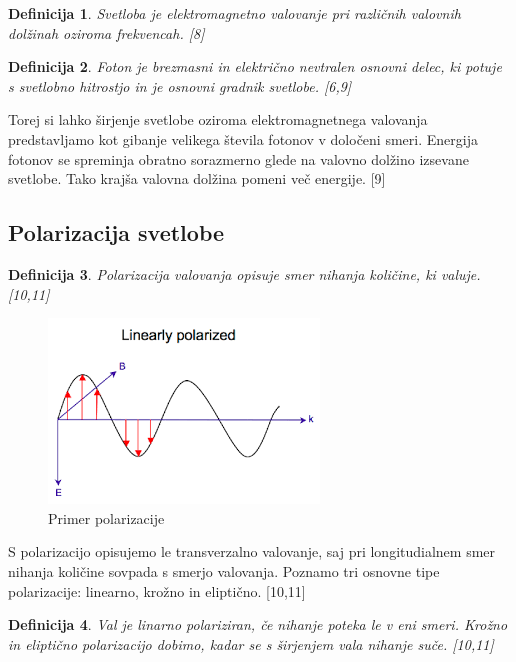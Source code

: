 \documentclass[A4paper, 11pt]{article}
\newtheorem{definicija}{Definicija}
\begin{document}
\begin{definicija}
Svetloba je elektromagnetno valovanje pri različnih valovnih dolžinah oziroma frekvencah. [8]
\end{definicija}

\begin{definicija}
Foton je brezmasni in električno nevtralen osnovni delec, ki potuje s svetlobno hitrostjo in je osnovni gradnik svetlobe. [6,9]
\end{definicija} 

Torej si lahko širjenje svetlobe oziroma elektromagnetnega valovanja predstavljamo kot gibanje velikega števila fotonov v določeni smeri. Energija fotonov se spreminja obratno sorazmerno glede na valovno dolžino izsevane svetlobe. Tako krajša valovna dolžina pomeni več energije. [9]

\subsection{Polarizacija svetlobe}

\begin{definicija}
Polarizacija valovanja opisuje smer nihanja količine, ki valuje. [10,11]
\end{definicija}

\begin{figure}[h]
\centering
\caption{Primer polarizacije}
\includegraphics[scale=0.75]{images}
\end{figure}

S polarizacijo opisujemo le transverzalno valovanje, saj pri longitudialnem smer nihanja količine sovpada s smerjo valovanja. Poznamo tri osnovne tipe polarizacije: linearno, krožno in eliptično. [10,11]

\begin{definicija}
Val je linarno polariziran, če nihanje poteka le v eni smeri. Krožno in eliptično polarizacijo dobimo, kadar se s širjenjem vala nihanje suče. [10,11]
\end{definicija}
\end{document}
